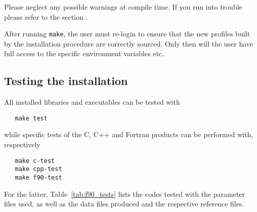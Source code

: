 \documentclass[12pt,twoside]{article}
\begin{document}
Please neglect any possible warnings at compile time. If you run into
trouble please refer to the section .

After running \texttt{make}, the user must re-login to ensure that the new profiles built by the installation
procedure are correctly sourced. Only then will the
user have full access to the specific \healpix
environment variables etc.

\subsection{Testing the installation}

All installed libraries and executables can be tested with 
\begin{verbatim}
   make test
\end{verbatim}

while specific tests of the C, C++ and Fortran products can be performed with,
respectively
\begin{verbatim}
   make c-test
   make cpp-test
   make f90-test
\end{verbatim}
For the latter, Table~\ref{tab:f90_tests} lists the codes tested with the
parameter files used, as well as the data files produced and the respective
reference files.
\end{document}
